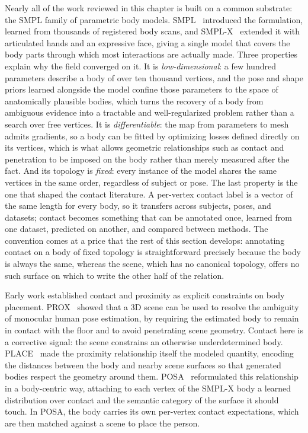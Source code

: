 Nearly all of the work reviewed in this chapter is built on a common substrate: the SMPL family of parametric body models. SMPL~\cite{loper2015smpl} introduced the formulation, learned from thousands of registered body scans, and SMPL-X~\cite{pavlakos2019smplx} extended it with articulated hands and an expressive face, giving a single model that covers the body parts through which most interactions are actually made. Three properties explain why the field converged on it. It is \emph{low-dimensional}: a few hundred parameters describe a body of over ten thousand vertices, and the pose and shape priors learned alongside the model confine those parameters to the space of anatomically plausible bodies, which turns the recovery of a body from ambiguous evidence into a tractable and well-regularized problem rather than a search over free vertices. It is \emph{differentiable}: the map from parameters to mesh admits gradients, so a body can be fitted by optimizing losses defined directly on its vertices, which is what allows geometric relationships such as contact and penetration to be imposed on the body rather than merely measured after the fact. And its topology is \emph{fixed}: every instance of the model shares the same vertices in the same order, regardless of subject or pose. The last property is the one that shaped the contact literature. A per-vertex contact label is a vector of the same length for every body, so it transfers across subjects, poses, and datasets; contact becomes something that can be annotated once, learned from one dataset, predicted on another, and compared between methods. The convention comes at a price that the rest of this section develops: annotating contact on a body of fixed topology is straightforward precisely because the body is always the same, whereas the scene, which has no canonical topology, offers no such surface on which to write the other half of the relation.

Early work established contact and proximity as explicit constraints on body placement. PROX~\cite{hassan2019prox} showed that a 3D scene can be used to resolve the ambiguity of monocular human pose estimation, by requiring the estimated body to remain in contact with the floor and to avoid penetrating scene geometry. Contact here is a corrective signal: the scene constrains an otherwise underdetermined body. PLACE~\cite{zhang2020place} made the proximity relationship itself the modeled quantity, encoding the distances between the body and nearby scene surfaces so that generated bodies respect the geometry around them. POSA~\cite{hassan2021posa} reformulated this relationship in a body-centric way, attaching to each vertex of the SMPL-X body a learned distribution over contact and the semantic category of the surface it should touch. In POSA, the body carries its own per-vertex contact expectations, which are then matched against a scene to place the person.

